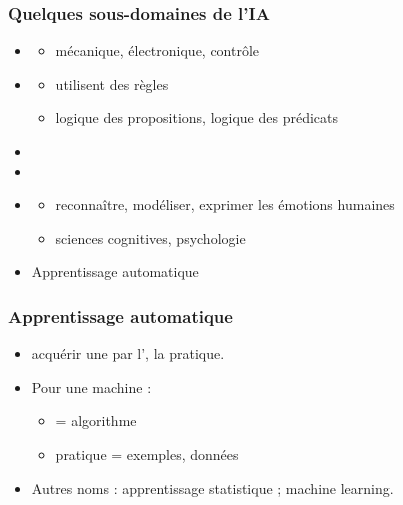 \begin{frame}
  \frametitle{Quelques sous-domaines de l'IA}
  \begin{itemize}
  \item {}
    \begin{itemize}
    \item mécanique, électronique, contrôle
    \end{itemize}
  \item {}
    \begin{itemize}
    \item utilisent des règles 
    \item logique des propositions, logique des prédicats
    \end{itemize}
  \item {}
  \item {}
  \item {} 
    \begin{itemize}
    \item reconnaître, modéliser, exprimer les émotions humaines
    \item sciences cognitives, psychologie
    \end{itemize}
  \item Apprentissage automatique
  \end{itemize}
\end{frame}

\begin{frame}
  \frametitle{Apprentissage automatique}
  \begin{itemize}
  \item {}
    \pause
    acquérir une  par l', la pratique.
  \item Pour une  machine :
    \begin{itemize}
    \item {} = algorithme
    \item {} pratique = exemples, données
    \end{itemize}
    \pause
  \item Autres noms : apprentissage statistique ; machine learning.
  \end{itemize}
\end{frame}

